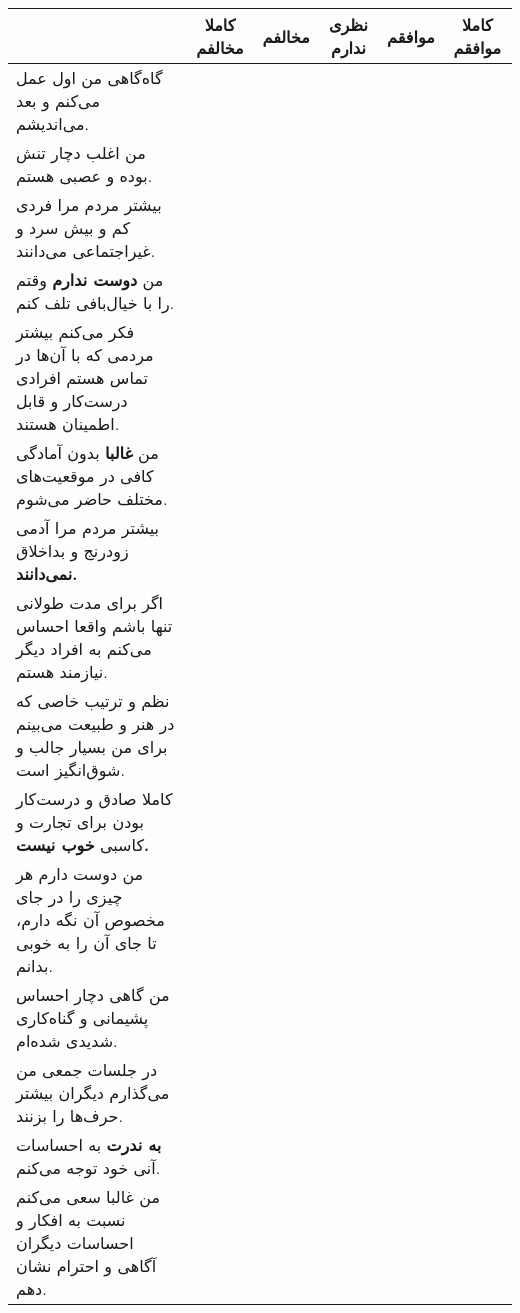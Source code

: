\documentclass[a4paper,10pt]{article}
\begin{document}
\begin{center}
\begin{tabular}{|p{6cm}|c|c|c|c|c|}
\hline
 & کاملا مخالفم & مخالفم & نظری ندارم & موافقم & کاملا موافقم\\
\hline

گاه‌گاهی من اول عمل می‌کنم و بعد می‌اندیشم.& & & & & \\
\hline

من اغلب دچار تنش بوده و عصبی هستم.& & & & & \\
\hline

بیشتر مردم مرا فردی کم و بیش سرد و غیراجتماعی می‌دانند.& & & & & \\
\hline

من \textbf{دوست ندارم} وقتم را با خیال‌بافی تلف کنم.& & & & & \\
\hline

فکر می‌کنم بیشتر مردمی که با آن‌ها در تماس هستم افرادی درست‌کار و قابل اطمینان هستند.& & & & & \\
\hline

من \textbf{غالبا}  بدون آمادگی کافی در موقعیت‌های مختلف حاضر می‌شوم.& & & & & \\
\hline

بیشتر مردم مرا آدمی زودرنج و بداخلاق \textbf{نمی‌دانند.}& & & & & \\
\hline

اگر برای مدت طولانی تنها باشم واقعا احساس می‌کنم به افراد دیگر نیازمند هستم.& & & & & \\
\hline

نظم و ترتیب خاصی که در هنر و طبیعت می‌بینم برای من بسیار جالب و شوق‌انگیز است.& & & & & \\
\hline

کاملا صادق و درست‌کار بودن برای تجارت و کاسبی \textbf{خوب نیست.}& & & & & \\
\hline

من دوست دارم هر چیزی را در جای مخصوص آن نگه دارم، تا جای آن را به خوبی بدانم.& & & & & \\
\hline

من گاهی دچار احساس پشیمانی و گناه‌کاری شدیدی شده‌ام.& & & & & \\
\hline

در جلسات جمعی من می‌گذارم دیگران بیشتر حرف‌ها را بزنند.& & & & & \\
\hline

\textbf{به ندرت} به احساسات آنی خود توجه می‌کنم.& & & & & \\
\hline

من غالبا سعی می‌کنم نسبت به افکار و احساسات دیگران آگاهی و احترام نشان دهم.& & & & & \\
\hline


\end{tabular}
\end{center}
\end{document}
